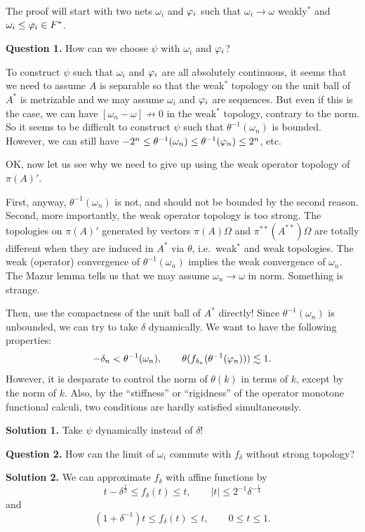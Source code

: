 \documentclass{../../../../small}
\begin{document}
The proof will start with two nets $\omega_i$ and $\varphi_i$ such that $\omega_i\to\omega$ weakly$^*$ and $\omega_i\le\varphi_i\in F^*$.



\noindent\textbf{Question 1.}
How can we choose $\psi$ with $\omega_i$ and $\varphi_i$?

To construct $\psi$ such that $\omega_i$ and $\varphi_i$ are all absolutely continuous, it seems that we need to assume $A$ is separable so that the weak$^*$ topology on the unit ball of $A^*$ is metrizable and we may assume $\omega_i$ and $\varphi_i$ are sequences.
But even if this is the case, we can have $[\omega_n-\omega]\not\to0$ in the weak$^*$ topology, contrary to the norm.
So it seems to be difficult to construct $\psi$ such that $\theta^{-1}(\omega_n)$ is bounded.
However, we can still have $-2^n\le\theta^{-1}(\omega_n)\le\theta^{-1}(\varphi_n)\le2^n$, etc.


OK, now let us see why we need to give up using the weak operator topology of $\pi(A)'$.


First, anyway, $\theta^{-1}(\omega_n)$ is not, and should not be bounded by the second reason.
Second, more importantly, the weak operator topology is too strong. 
The topologies on $\pi(A)'$ generated by vectors $\pi(A)\Omega$ and $\pi^{**}(A^{**})\Omega$ are totally different when they are induced in $A^*$ via $\theta$, i.e.~weak$^*$ and weak topologies.
The weak (operator) convergence of $\theta^{-1}(\omega_n)$ implies the weak convergence of $\omega_n$.
The Mazur lemma tells us that we may assume $\omega_n\to\omega$ in norm.
Something is strange.

Then, use the compactness of the unit ball of $A^*$ directly!
Since $\theta^{-1}(\omega_n)$ is unbounded, we can try to take $\delta$ dynamically.
We want to have the following properties:
\[-\delta_n<\theta^{-1}(\omega_n),\qquad\theta(f_{\delta_n}(\theta^{-1}(\varphi_n)))\lesssim1.\]
However, it is desparate to control the norm of $\theta(k)$ in terms of $k$, except by the norm of $k$.
Also, by the ``stiffness'' or ``rigidness'' of the operator monotone functional calculi, two conditions are hardly satisfied simultaneously.

\noindent\textbf{Solution 1.}
Take $\psi$ dynamically instead of $\delta$!



\noindent\textbf{Question 2.}
How can the limit of $\omega_i$ commute with $f_\delta$ without strong topology?

\noindent\textbf{Solution 2.}
We can approximate $f_\delta$ with affine functions
by
\[t-\delta^{\frac12}\le f_\delta(t)\le t,\qquad|t|\le2^{-1}\delta^{-\frac14}\]
and
\[(1+\delta^{-1})t\le f_\delta(t)\le t,\qquad 0\le t\le1.\]
\end{document}
